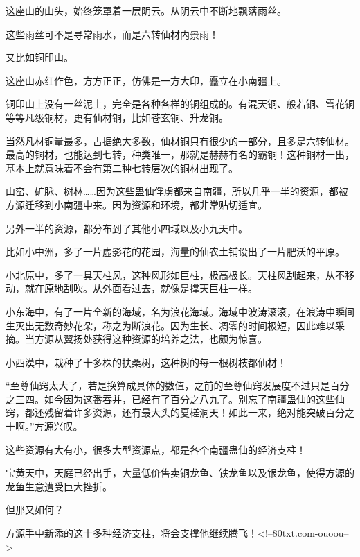 \begin{this_body}
这座山的山头，始终笼罩着一层阴云。从阴云中不断地飘落雨丝。

这些雨丝可不是寻常雨水，而是六转仙材内景雨！

又比如铜印山。

这座山赤红作色，方方正正，仿佛是一方大印，矗立在小南疆上。

铜印山上没有一丝泥土，完全是各种各样的铜组成的。有混天铜、般若铜、雪花铜等等凡级铜材，更有仙材铜，比如苍玄铜、升龙铜。

当然凡材铜量最多，占据绝大多数，仙材铜只有很少的一部分，且多是六转仙材。最高的铜材，也能达到七转，种类唯一，那就是赫赫有名的霸铜！这种铜材一出，基本上就意味着不会有第二种七转层次的铜材出现了。

山峦、矿脉、树林……因为这些蛊仙俘虏都来自南疆，所以几乎一半的资源，都被方源迁移到小南疆中来。因为资源和环境，都非常贴切适宜。

另外一半的资源，都分布到了其他小四域以及小九天中。

比如小中洲，多了一片虚影花的花园，海量的仙农土铺设出了一片肥沃的平原。

小北原中，多了一具天柱风，这种风形如巨柱，极高极长。天柱风刮起来，从不移动，就在原地刮吹。从外面看过去，就像是撑天巨柱一样。

小东海中，有了一片全新的海域，名为浪花海域。海域中波涛滚滚，在浪涛中瞬间生灭出无数奇妙花朵，称之为断浪花。因为生长、凋零的时间极短，因此难以采摘。当方源从翼扬处获得这种资源的培养之法，也颇为惊喜。

小西漠中，栽种了十多株的扶桑树，这种树的每一根树枝都仙材！

“至尊仙窍太大了，若是换算成具体的数值，之前的至尊仙窍发展度不过只是百分之三四。如今因为这番吞并，已经有了百分之八九了。别忘了南疆蛊仙的这些仙窍，都还残留着许多资源，还有最大头的夏槎洞天！如此一来，绝对能突破百分之十啊。”方源兴叹。

这些资源有大有小，很多大型资源点，都是各个南疆蛊仙的经济支柱！

宝黄天中，天庭已经出手，大量低价售卖铜龙鱼、铁龙鱼以及银龙鱼，使得方源的龙鱼生意遭受巨大挫折。

但那又如何？

方源手中新添的这十多种经济支柱，将会支撑他继续腾飞！<!--80txt.com-ouoou-->

\end{this_body}


